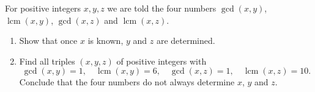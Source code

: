 For positive integers $x,y,z$ we are told the four numbers $\gcd(x,y)$, $\operatorname{lcm}(x,y)$, $\gcd(x,z)$ and $\operatorname{lcm}(x,z)$.
\begin{enumerate}
\item[(a)] Show that once $x$ is known, $y$ and $z$ are determined.
\item[(b)] Find all triples $(x,y,z)$ of positive integers with
\[\gcd(x,y)=1,\quad\operatorname{lcm}(x,y)=6,\quad\gcd(x,z)=1,\quad\operatorname{lcm}(x,z)=10.\]
Conclude that the four numbers do not always determine $x$, $y$ and $z$.
\end{enumerate}
